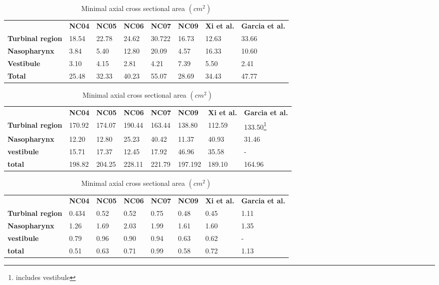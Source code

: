 \begin{table}[geometric comparison]
\begin{tabular}{llllllll}
 & \textbf{NC04} & \textbf{NC05} & \textbf{NC06} & \textbf{NC07} & \textbf{NC09} &\textbf{Xi et al.\cite{Xi2012}} & \textbf{Garcia et al.\cite{Garcia2007}} \\
\cline{2-8}
\textbf{Turbinal region} & 18.54 & 22.78 & 24.62 & 30.722 & 16.73 & 12.63 & 33.66\\
\textbf{Nasopharynx}  & 3.84 & 5.40 & 12.80 & 20.09 & 4.57 & 16.33 & 10.60\\
\textbf{Vestibule} & 3.10 & 4.15 & 2.81 & 4.21 & 7.39 & 5.50 & 2.41\\
\textbf{Total} & 25.48 & 32.33 & 40.23 & 55.07 & 28.69 & 34.43 & 47.77 \\
\hline
\end{tabular}
\caption{ sectional volume, according to sections as seen in Figure \ref{fig:regions} ($ cm^3 $)}\label{tab:secvol}
\begin{tabular}{llllllll}
 & \textbf{NC04} & \textbf{NC05} & \textbf{NC06} & \textbf{NC07} &\textbf{NC09}& \textbf{Xi et al.} & \textbf{Garcia et al.}\\
 \cline{2-8}
\textbf{Turbinal region} & 170.92 & 174.07& 190.44 & 163.44 & 138.80 & 112.59 & 133.50\footnote{includes vestibule} \\
\textbf{Nasopharynx} & 12.20 & 12.80 & 25.23 & 40.42 & 11.37 & 40.93 & 31.46\\
\textbf{vestibule} & 15.71 & 17.37 & 12.45 & 17.92 & 46.96 & 35.58 &  -\\
\textbf{total} & 198.82 & 204.25 & 228.11 & 221.79 & 197.192 & 189.10 & 164.96\\
\hline
\end{tabular}
\caption{sectional surface area, according to sections shown in Figure \ref{fig:regions}($ cm^2 $)}\label{tab:secsa}
\begin{tabular}{llllllll}
& \textbf{NC04}  & \textbf{NC05} & \textbf{NC06} & \textbf{NC07} & \textbf{NC09} & \textbf{Xi et al.} & \textbf{Garcia et al.}\\
 \cline{2-8}
\textbf{Turbinal region} & 0.434 & 0.52 & 0.52 & 0.75 & 0.48 & 0.45 & 1.11\\
\textbf{Nasopharynx} & 1.26 & 1.69 & 2.03 & 1.99 & 1.61 & 1.60 & 1.35\\
\textbf{vestibule} & 0.79 & 0.96 & 0.90 & 0.94 & 0.63 & 0.62 &  - \\
\textbf{total} & 0.51 & 0.63 & 0.71 & 0.99 & 0.58 & 0.72 & 1.13 \\
\hline
\end{tabular}
\caption{Effective diameter $d_{eff} = \frac{4v}{a} (cm) $}\label{tab:deff}
\centering

\caption{Minimal axial cross sectional area $(cm^2)$}\label{tab:mca}
\end{table}

